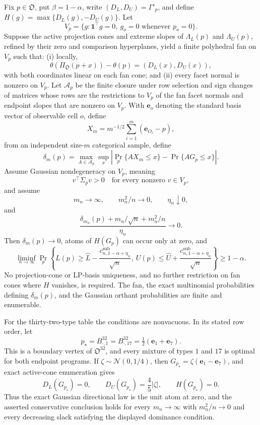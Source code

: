 Fix \(p\in\mathfrak O\), put \(\beta=1-\alpha\), write \((D_L,D_U)=\Gamma'_p\), and define \(H(g)=\max\{D_L(g),-D_U(g)\}\).  Let
\[
V_p=\{g:\mathbf 1^{\top}g=0,\ g_o=0\text{ whenever }p_o=0\}.
\]
Suppose the active projection cones and extreme slopes of \(\Lambda_L(p)\) and \(\Lambda_U(p)\), refined by their zero and comparison hyperplanes, yield a finite polyhedral fan on \(V_p\) such that: (i) locally,
\[
\theta(\Pi_{\mathfrak O}(p+x))-\theta(p)=(D_L(x),D_U(x)),
\]
with both coordinates linear on each fan cone; and (ii) every facet normal is nonzero on \(V_p\).  Let \(\mathcal A_p\) be the finite closure under row selection and sign changes of matrices whose rows are the restrictions to \(V_p\) of the fan facet normals and endpoint slopes that are nonzero on \(V_p\).  With \(\mathbf e_o\) denoting the standard basis vector of observable cell \(o\), define
\[
X_m=m^{-1/2}\sum_{i=1}^m(\mathbf e_{O_i}-p),
\]
from an independent size-\(m\) categorical sample, define
\[
\delta_m(p)=\max_{A\in\mathcal A_p}\sup_x
\left|\Pr_p\{AX_m\leq x\}-\Pr\{AG_p\leq x\}\right|.
\]
Assume Gaussian nondegeneracy on \(V_p\), meaning
\[
v^{\top}\Sigma_pv>0\quad\text{for every nonzero }v\in V_p,
\]
and assume
\[
m_n\to\infty,\qquad m_n^2/n\to0,\qquad\eta_n\downarrow0,
\]
and
\[
\frac{\delta_{m_n}(p)+m_n/\sqrt n+m_n^2/n}{\eta_n}\to0.
\]
Then \(\delta_m(p)\to0\), atoms of \(H(G_p)\) can occur only at zero, and
\[
\liminf_{n\to\infty}\Pr_p\left\{
L(p)\geq\widehat L-\frac{c^{\mathrm{sub}}_{n,1-\alpha+\eta_n}}{\sqrt n},\
U(p)\leq\widehat U+\frac{c^{\mathrm{sub}}_{n,1-\alpha+\eta_n}}{\sqrt n}
\right\}\geq1-\alpha.
\]
No projection-cone or LP-basis uniqueness, and no further restriction on fan cones where \(H\) vanishes, is required.  The fan, the exact multinomial probabilities defining \(\delta_m(p)\), and the Gaussian orthant probabilities are finite and enumerable.

For the thirty-two-type table the conditions are nonvacuous.  In its stated row order, let
\[
p_\star=B^{32}_{\cdot,1}=B^{32}_{\cdot,17}
=\tfrac12(\mathbf e_1+\mathbf e_7).
\]
This is a boundary vertex of \(\mathfrak O^{32}\), and every mixture of types \(1\) and \(17\) is optimal for both endpoint programs.  If \(\zeta\sim\mathcal N(0,1/4)\), then \(G_{p_\star}=\zeta(\mathbf e_1-\mathbf e_7)\), and exact active-cone enumeration gives
\[
D_L(G_{p_\star})=0,\qquad
D_U(G_{p_\star})=\frac45|\zeta|,\qquad
H(G_{p_\star})=0.
\]
Thus the exact Gaussian directional law is the unit atom at zero, and the asserted conservative conclusion holds for every \(m_n\to\infty\) with \(m_n^2/n\to0\) and every decreasing slack satisfying the displayed dominance condition.